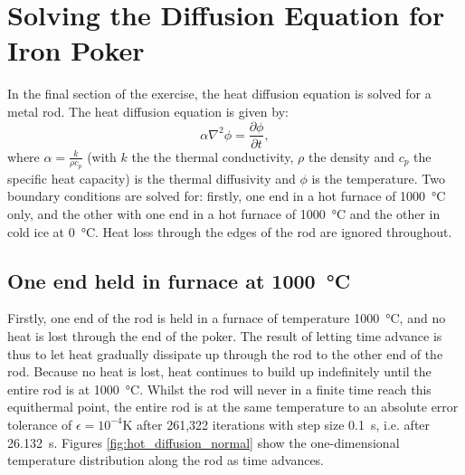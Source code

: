 \section{Solving the Diffusion Equation for Iron Poker}
\label{sec:diffusion_equation}

In the final section of the exercise, the heat diffusion equation is solved for a metal rod. The heat diffusion equation is given by:
\begin{equation}
    \alpha \nabla^2 \phi = \frac{\partial \phi}{\partial t},
\end{equation}
where $\alpha = \frac{k}{\rho c_p}$ (with $k$ the the thermal conductivity, $\rho$ the density and $c_p$ the specific heat capacity) is the thermal diffusivity and $\phi$ is the temperature. Two boundary conditions are solved for: firstly, one end in a hot furnace of \SI{1000}{\celsius} only, and the other with one end in a hot furnace of \SI{1000}{\celsius} and the other in cold ice at \SI{0}{\celsius}. Heat loss through the edges of the rod are ignored throughout.

\subsection{One end held in furnace at \SI{1000}{\celsius}}
\label{subsec:hot}

Firstly, one end of the rod is held in a furnace of temperature \SI{1000}{\celsius}, and no heat is lost through the end of the poker. The result of letting time advance is thus to let heat gradually dissipate up through the rod to the other end of the rod. Because no heat is lost, heat continues to build up indefinitely until the entire rod is at \SI{1000}{\celsius}. Whilst the rod will never in a finite time reach this equithermal point, the entire rod is at the same temperature to an absolute error tolerance of $\epsilon = 10^{-4}$\si{\kelvin} after 261,322 iterations with step size \SI{0.1}{\second}, i.e. after \SI{26,132}{\second}. Figures \ref{fig:hot_diffusion_normal} show the one-dimensional temperature distribution along the rod as time advances.

